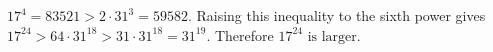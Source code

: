 $ 17^4=83521>2\cdot31^3=59582 $. Raising this inequality to the sixth power gives $ 17^{24}>64\cdot31^{18}>31\cdot31^{18}=31^{19}$. Therefore $\boxed{17^{24}\text{ is larger}}$.

